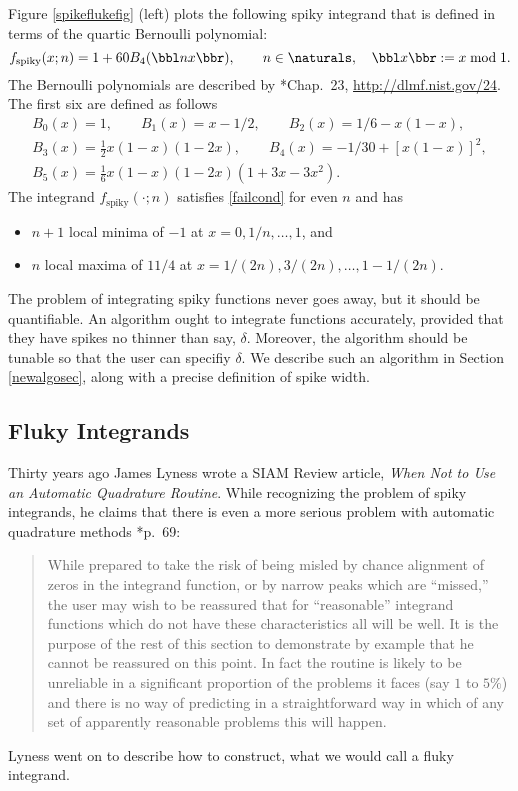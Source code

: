 \documentclass[]{amsart}
\theoremstyle{definition}
\theoremstyle{remark}
\begin{document}
Figure \ref{spikeflukefig} (left) plots the following spiky integrand that is defined in terms of the quartic Bernoulli polynomial:
\begin{equation} \label{spiky}
f_{\text{spiky}}(x;n) = 1 + 60 B_4(\bbl nx \bbr), \qquad n \in \naturals, \quad \bbl x \bbr := x \bmod 1.
\end{equation}
The Bernoulli polynomials are described by *{Chap.\ 23, \url{http://dlmf.nist.gov/24}}.  The first six are defined as follows 
\begin{subequations} \label{Bernoulli}
\begin{gather} 
B_0(x) = 1, \qquad B_1(x) = x-1/2,  \qquad 
B_2(x)=1/6 - x(1-x), \\ 
B_3(x) = \frac{1}{2} x(1-x)(1-2x), \qquad B_4(x) = -1/30 + [x(1-x)]^2, \\
B_5(x) = \frac{1}{6} x(1-x)(1-2x)(1 + 3 x - 3 x^2).
\end{gather}
\end{subequations}
The integrand $f_{\text{spiky}}(\cdot;n)$ satisfies \eqref{failcond} for even $n$ and has 
\begin{itemize}
\item $n+1$ local minima of $-1$ at $x=0, 1/n, \ldots, 1$, and
\item $n$ local maxima of $11/4$ at $x=1/(2n), 3/(2n), \ldots, 1-1/(2n)$.
\end{itemize}

The problem of integrating spiky functions never goes away, but it should be quantifiable.  An algorithm ought to integrate functions accurately, provided that they have spikes no thinner than say, $\delta$.  Moreover, the algorithm should be tunable so that the user can specifiy $\delta$.  We describe such an algorithm in Section \ref{newalgosec}, along with a precise definition of spike width.

\subsection{Fluky Integrands} 

Thirty years ago James Lyness wrote a SIAM Review article, \emph{When Not to Use an Automatic Quadrature Routine}.  While recognizing the problem of spiky integrands, he claims that there is even a more serious problem with automatic quadrature methods   \cite{Lyn83}*{p.\ 69}:
\begin{quote}
While prepared to take the risk of being misled by chance alignment of zeros in the integrand function, or by narrow peaks which are ``missed,'' the user may wish to be reassured that for ``reasonable'' integrand functions which do not have these characteristics all will be well. It is the purpose of the rest of this section to demonstrate by example that he cannot be reassured on this point. In fact the routine is likely to be unreliable in a significant proportion of the problems it faces (say $1$ to $5\%$) and there is no way of predicting in a straightforward way in which of any set of apparently reasonable problems this will happen.
\end{quote}
Lyness went on to describe how to construct, what we would call a fluky integrand.  
\end{document}
